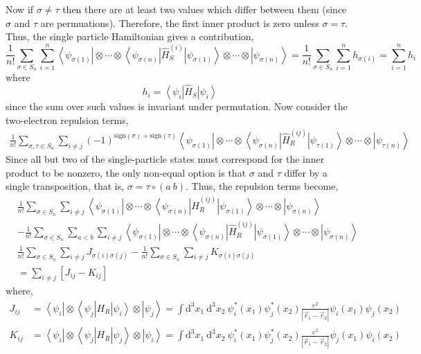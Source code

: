 \documentclass[12pt]{extarticle}
\newcommand{\dn}[2]{ \mathrm{d}^{#1} #2 \:}
\theoremstyle{definition}
\renewcommand{\H}{\hat{H}}
\newcommand{\ket}[1]{\left| #1 \right>}
\newcommand{\bra}[1]{\left< #1 \right|}
\newcommand{\sign}[1]{\mathrm{sign}\left( #1 \right)}
\begin{document}
Now if $\sigma \neq \tau$ then there are at least two values which differ between them (since $\sigma$ and $\tau$ are permuations). Therefore, the first inner product is zero unless $\sigma = \tau$. Thus, the single particle Hamiltonian gives a contribution,
\[ \frac{1}{n!} \sum_{\sigma \in S_n} \sum_{i = 1}^n \bra{\psi_{\sigma(1)}} \otimes \cdots \otimes \bra{\psi_{\sigma(n)}} \H_S^{(i)} \ket{\psi_{\sigma(1)}} \otimes \cdots \otimes \ket{\psi_{\sigma(n)}} = \frac{1}{n!}  \sum_{\sigma \in S_n} \sum_{i = 1}^n h_{\sigma(i)} = \sum_{i = 1}^n h_i \]
where
\[ h_i = \bra{\psi_i} \H_S \ket{\psi_i} \]
since the sum over such values is invariant under permutation. Now consider the two-electron repulsion terms,
\begin{align*}
\frac{1}{n!} \sum_{\sigma, \tau \in S_n} \sum_{i \neq j} (-1)^{\sign{\sigma} + \sign{\tau}} \bra{\psi_{\sigma(1)}} \otimes \cdots \otimes \bra{\psi_{\sigma(n)}} \H_R^{(ij)} \ket{\psi_{\tau(1)}} \otimes \cdots \otimes \ket{\psi_{\tau(n)}}
\end{align*}
Since all but two of the single-particle states must correspond for the inner product to be nonzero, the only non-equal option is that $\sigma$ and $\tau$ differ by a single transposition, that is, $\sigma = \tau \circ (a \: b)$. Thus, the repulsion terms become,
\begin{align*}
& \frac{1}{n!} \sum_{\sigma \in S_n} \sum_{i \neq j}  \bra{\psi_{\sigma(1)}} \otimes \cdots \otimes \bra{\psi_{\sigma(n)}} \H_R^{(ij)} \ket{\psi_{\sigma(1)}} \otimes \cdots \otimes \ket{\psi_{\sigma(n)}}
\\
& -
\frac{1}{n!} \sum_{\sigma \in S_n} \sum_{a < b} \sum_{i \neq j} \bra{\psi_{\sigma(1)}} \otimes \cdots \otimes \bra{\psi_{\sigma(n)}} \H_R^{(ij)} \ket{\psi_{\sigma(1)}} \otimes \cdots \otimes \ket{\psi_{\sigma(n)}}
\\
& \frac{1}{n!} \sum_{\sigma \in S_n} \sum_{i \neq j}  J_{\sigma(i) \sigma(j)} - \frac{1}{n!} \sum_{\sigma \in S_n} \sum_{i \neq j} K_{\sigma(i) \sigma(j)}
\\
& = \sum_{i \neq j} [ J_{ij} - K_{ij} ]
\end{align*} 
where,
\begin{align*}
J_{ij} & = \bra{\psi_i} \otimes \bra{\psi_j} H_R \ket{\psi_i} \otimes \ket{\psi_j} = \int \dn{3}{x_1} \dn{3}{x_2} \psi_i^*(x_1) \psi_j^*(x_2) \frac{e^2}{|\vec{r}_1 - \vec{r}_2|} \psi_i(x_1) \psi_j(x_2)
\\
K_{ij} & = \bra{\psi_i} \otimes \bra{\psi_j} H_R \ket{\psi_j} \otimes \ket{\psi_i} = \int \dn{3}{x_1} \dn{3}{x_2} \psi_i^*(x_1) \psi_j^*(x_2) \frac{e^2}{|\vec{r}_1 - \vec{r}_2|} \psi_j(x_1) \psi_i(x_2)
\end{align*}
\end{document}
